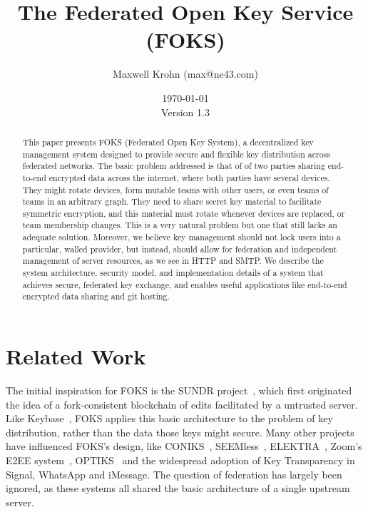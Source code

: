 \documentclass[11pt]{article}
\title{The Federated Open Key Service (FOKS)}
\author{Maxwell Krohn (max@ne43.com)}
\date{\today\\Version 1.3}
\begin{document}
\newcommand{\yubi}{Yubikey}
\newcommand{\Yubi}{Yubikey}
\newcommand{\yubis}{Yubikeys}
\newcommand{\Yubis}{Yubikeys}

\maketitle

\begin{abstract}

This paper presents FOKS (Federated Open Key System), a
decentralized key management system designed to provide secure and flexible key
distribution across federated networks. The basic problem addressed is that of
of two parties sharing end-to-end encrypted data across the internet, where both
parties have several devices. They might rotate devices, form mutable teams with
other users, or even teams of teams in an arbitrary graph. They need to share
secret key material to facilitate symmetric encryption, and this material must
rotate whenever devices are replaced, or team membership changes.  This is a
very natural problem but one that still lacks an adequate solution.  Moreover, we
believe key management should not lock users into a particular, walled provider,
but instead, should allow for federation and independent management of server
resources, as we see in HTTP and SMTP.  We describe the system architecture,
security model, and implementation details of a system that achieves secure,
federated key exchange, and enables useful applications like end-to-end
encrypted data sharing and git hosting.

\end{abstract}











\section{Related Work}

The initial inspiration for FOKS is the SUNDR project~\cite{sundr}, which first
originated the idea of a fork-consistent blockchain of edits facilitated by a
untrusted server.  Like Keybase~\cite{keybase}, FOKS applies this basic
architecture to the problem of key distribution, rather than the data those keys
might secure. Many other projects have influenced FOKS's design, like
CONIKS~\cite{melara2015coniks}, SEEMless~\cite{chase2019seemless}, 
ELEKTRA~\cite{cryptoeprint:2024/107}, Zoom's E2EE system~\cite{zoom_e2e_v4}, 
OPTIKS~\cite{cryptoeprint:2023/1515} and the widespread adoption of Key
Transparency in Signal, WhatsApp and iMessage. The question of federation has
largely been ignored, as these systems all shared the basic architecture of a
single upstream server. 
\end{document}
